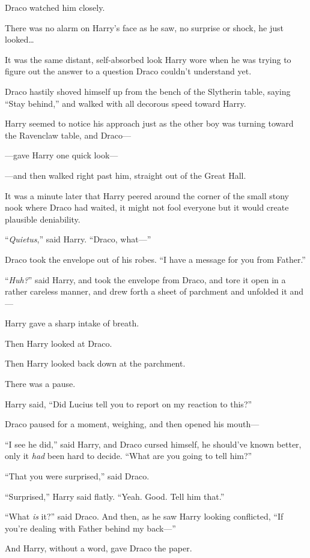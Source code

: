 Draco watched him closely.

There was no alarm on Harry’s face as he saw, no surprise or shock, he just looked…

It was the same distant, self-absorbed look Harry wore when he was trying to figure out the answer to a question Draco couldn’t understand yet.

Draco hastily shoved himself up from the bench of the Slytherin table, saying “Stay behind,” and walked with all decorous speed toward Harry.

Harry seemed to notice his approach just as the other boy was turning toward the Ravenclaw table, and Draco—

—gave Harry one quick look—

—and then walked right past him, straight out of the Great Hall.

It was a minute later that Harry peered around the corner of the small stony nook where Draco had waited, it might not fool everyone but it would create plausible deniability.

“\emph{Quietus},” said Harry. “Draco, what—”

Draco took the envelope out of his robes. “I have a message for you from Father.”

“\emph{Huh?}” said Harry, and took the envelope from Draco, and tore it open in a rather careless manner, and drew forth a sheet of parchment and unfolded it and—

Harry gave a sharp intake of breath.

Then Harry looked at Draco.

Then Harry looked back down at the parchment.

There was a pause.

Harry said, “Did Lucius tell you to report on my reaction to this?”

Draco paused for a moment, weighing, and then opened his mouth—

“I see he did,” said Harry, and Draco cursed himself, he should’ve known better, only it \emph{had} been hard to decide. “What are you going to tell him?”

“That you were surprised,” said Draco.

“Surprised,” Harry said flatly. “Yeah. Good. Tell him that.”

“What \emph{is} it?” said Draco. And then, as he saw Harry looking conflicted, “If you’re dealing with Father behind my back—”

And Harry, without a word, gave Draco the paper.

